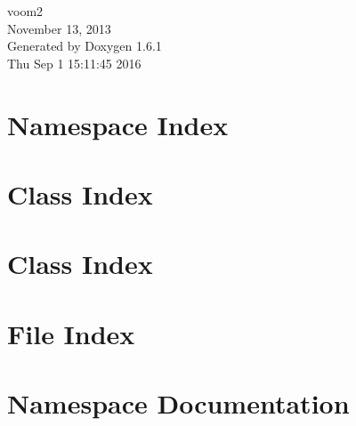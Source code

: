 \documentclass[a4paper]{book}
\begin{document}
\hypersetup{pageanchor=false}
\begin{titlepage}
\vspace*{7cm}
\begin{center}
{\Large voom2 \\[1ex]\large November 13, 2013 }\\
\vspace*{1cm}
{\large Generated by Doxygen 1.6.1}\\
\vspace*{0.5cm}
{\small Thu Sep 1 15:11:45 2016}\\
\end{center}
\end{titlepage}
\clearemptydoublepage
{}
\tableofcontents
\clearemptydoublepage
{}
\hypersetup{pageanchor=true}
\chapter{Namespace Index}

\chapter{Class Index}

\chapter{Class Index}

\chapter{File Index}

\chapter{Namespace Documentation}

\end{document}
